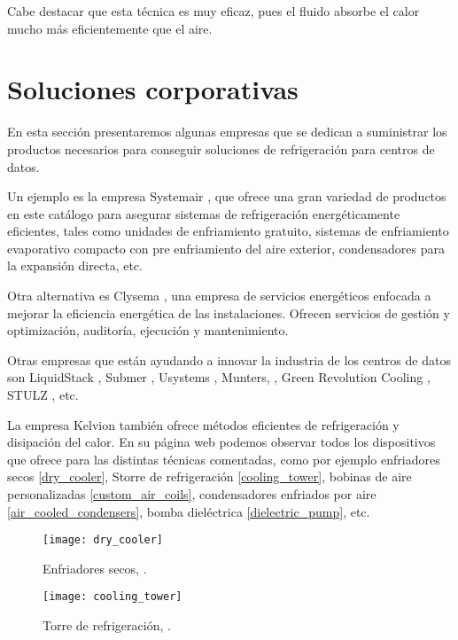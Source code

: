 Cabe destacar que esta técnica es muy eficaz, pues el fluido absorbe el calor mucho más eficientemente que el aire.

\section{Soluciones corporativas} \label{empresas}

En esta sección presentaremos algunas empresas que se dedican a suministrar los productos necesarios para conseguir soluciones de refrigeración para centros de datos.

Un ejemplo es la empresa Systemair \cite{systemair}, que ofrece una gran variedad de productos en este catálogo para asegurar sistemas de refrigeración energéticamente eficientes, tales como unidades de enfriamiento gratuito, sistemas de enfriamiento evaporativo compacto con pre enfriamiento del aire exterior, condensadores para la expansión directa, etc.

Otra alternativa es Clysema \cite{clysema}, una empresa de servicios energéticos enfocada a mejorar la eficiencia energética de las instalaciones. Ofrecen servicios de gestión y optimización, auditoría, ejecución y mantenimiento.

Otras empresas que están ayudando a innovar la industria de los centros de datos son LiquidStack \cite{liquidstack}, Submer \cite{submer}, Usystems \cite{usystems}, Munters, \cite{munters}, Green Revolution Cooling \cite{GRC}, STULZ \cite{stulz}, etc.

La empresa Kelvion \cite{Kelvion} también ofrece métodos eficientes de refrigeración y disipación del calor. En su página web podemos observar todos los dispositivos que ofrece para las distintas técnicas comentadas, como por ejemplo enfriadores secos \eqref{dry_cooler}, Storre de refrigeración \eqref{cooling_tower}, bobinas de aire personalizadas \eqref{custom_air_coils}, condensadores enfriados por aire \eqref{air_cooled_condensers}, bomba dieléctrica \eqref{dielectric_pump}, etc.

\begin{figure}
    \begin{center}
        \texttt{[image: dry\_cooler]}
        \caption{Enfriadores secos, \cite{Kelvion}.}
        \label{dry_cooler}
    \end{center}
\end{figure}

\begin{figure}
    \begin{center}
        \texttt{[image: cooling\_tower]}
        \caption{Torre de refrigeración, \cite{Kelvion}.}
        \label{cooling_tower}
    \end{center}
\end{figure}

